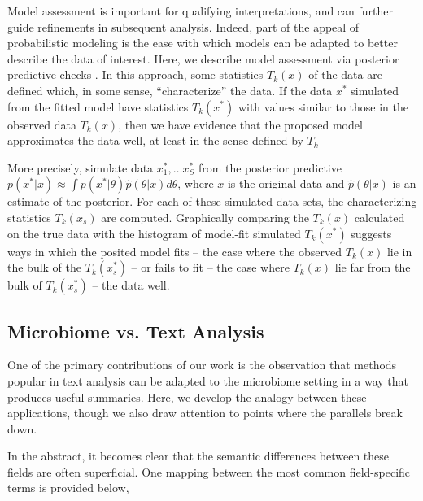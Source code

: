 \documentclass[oupdraft]{bio}
\begin{document}
Model assessment is important for qualifying interpretations, and can further
guide refinements in subsequent analysis. Indeed, part of the appeal of
probabilistic modeling is the ease with which models can be adapted to better
describe the data of interest. Here, we describe model assessment via posterior
predictive checks \citep{rubin1984bayesianly, gelman2013philosophy}. In this
approach, some statistics $T_{k}\left(x\right)$ of the data are defined which,
in some sense, ``characterize'' the data. If the data $x^{\ast}$ simulated from
the fitted model have statistics $T_{k}\left(x^{\ast}\right)$ with values
similar to those in the observed data $T_{k}\left(x\right)$, then we have
evidence that the proposed model approximates the data well, at least in the
sense defined by $T_{k}$

More precisely, simulate data $x_{1}^{\ast}, \dots x_{S}^{\ast}$ from the
posterior predictive $p\left(x^{\ast}\vert x\right) \approx \int p\left(x^{\ast}
\vert \theta\right) \hat{p}\left(\theta \vert x \right)d\theta$, where $x$ is
the original data and $\hat{p}\left(\theta \vert x\right)$ is an estimate of the
posterior. For each of these simulated data sets, the characterizing statistics
$T_{k}\left(x_{s}\right)$ are computed. Graphically comparing the
$T_{k}\left(x\right)$ calculated on the true data with the histogram of
model-fit simulated $T_{k}\left(x^{\ast}\right)$ suggests ways in which the
posited model fits -- the case where the observed $T_{k}\left(x\right)$ lie in
the bulk of the $T_{k}\left(x^{\ast}_{s}\right)$ -- or fails to fit -- the case
where $T_{k}\left(x\right)$ lie far from the bulk of
$T_{k}\left(x^{\ast}_{s}\right)$ -- the data well.

\subsection{Microbiome vs. Text Analysis}

One of the primary contributions of our work is the observation that methods
popular in text analysis can be adapted to the microbiome setting in a way that
produces useful summaries. Here, we develop the analogy between these
applications, though we also draw attention to points where the parallels break
down.

In the abstract, it becomes clear that the semantic differences between these
fields are often superficial. One mapping between the most common field-specific
terms is provided below,
\end{document}
